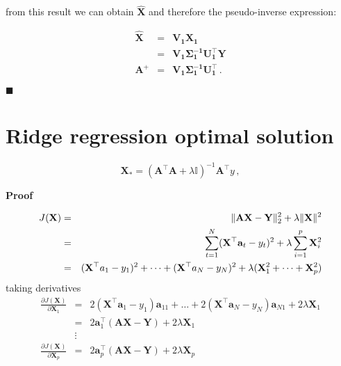 \noindent from this result we can obtain $\mathbf{\hat{\mathbf{X}}}$ and
therefore the pseudo-inverse expression:

\begin{eqnarray*}
\mathbf{\hat{\mathbf{X}}} &=& \mathbf{V_1 \mathbf{X}_1} \\
                &=& \mathbf{V_1 \Sigma_1^{-1} U_1^\top Y} \\
\mathbf{A^+} &=& \mathbf{V_1 \Sigma_1^{-1} U_1^\top} \, .
\end{eqnarray*}

$\blacksquare$

\section{Ridge regression optimal solution}\label{app:rroptsection}

\begin{equation*}
\mathbf{\mathbf{X}}_*=(\mathbf{A}^\top \mathbf{A}+\lambda \mathbb{I})^{-1}\mathbf{A}^\top y \, ,
\end{equation*}


\textbf{Proof}\quad

\begin{eqnarray*}
J(\mathbf{\mathbf{X}}) &=&  \| \mathbf{A}\mathbf{\mathbf{X}} - \mathbf{Y} \|_2^2  + \lambda
 \| \mathbf{\mathbf{X}}\| ^2 \\
 &=&  \sum_{t=1}^N (\mathbf{\mathbf{X}}^\top {\bf a}_t-y_t)^2 + \lambda \sum_{i=1}^p \mathbf{X}_i^2 \\
 &=& (\mathbf{X}^\top a_1-y_1)^2 + \dots + (\mathbf{X}^\top a_N-y_N)^2 + \lambda (\mathbf{X}_1^2+\dots+\mathbf{X}_p^2)
\end{eqnarray*}
\noindent taking derivatives
 \begin{eqnarray*}
 \frac{\partial J(\mathbf{\mathbf{X}})}{\partial \mathbf{X}_1}&=& 
 2(\mathbf{X}^\top \mathbf{a}_1-y_1)\mathbf{a}_{11} + \dots + 2(\mathbf{X}^\top \mathbf{a}_N-y_N)\mathbf{a}_{N1} + 2\lambda \mathbf{X}_1 \\
 &=& 2\mathbf{a}_1^\top(\mathbf{A}\mathbf{X}-\mathbf{Y}) + 2\lambda\mathbf{X}_1\\
& \vdots &\\
  \frac{\partial J(\mathbf{\mathbf{X}})}{\partial \mathbf{X}_p}&=& 
 2\mathbf{a}_p^\top(\mathbf{A}\mathbf{X}-\mathbf{Y}) + 2\lambda\mathbf{X}_p 
\end{eqnarray*}

